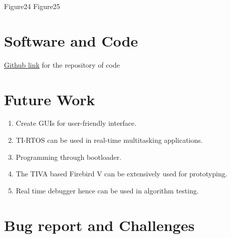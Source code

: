 \documentclass[a4paper,12pt,oneside]{book}
\begin{document}
\hspace{2cm}
Figure24
\hspace{4.5cm}
Figure25

\section{Software and Code}
\href{http://www.github.com}{Github link} for the repository of code



\section{Future Work}
\begin{enumerate}
	\item Create GUIs for user-friendly interface.
	\item TI-RTOS can be used in real-time multitasking applications. 
	\item Programming through bootloader.
	\item The TIVA based Firebird V can be extensively used for prototyping. 
	\item Real time debugger hence can be used in algorithm testing. 
\end{enumerate}

\section{Bug report and Challenges}
\end{document}
